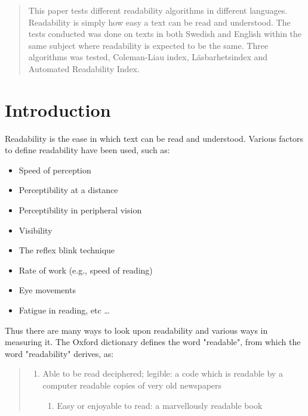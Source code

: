 \documentclass[a4paper]{article}
\begin{document}
\begin{abstract}
This paper tests different readability algorithms in different languages. Readability is simply how easy a text can be read and understood. The tests conducted was done on texts in both Swedish and English within the same subject where readability is expected to be the same. Three algorithms was tested, Coleman-Liau index, Läsbarhetsindex and Automated Readability Index. 
\end{abstract}
\newpage

\tableofcontents
\newpage


\section{Introduction}

Readability is the ease in which text can be read and understood. Various factors to define readability have been used, such as:

\begin{itemize}
  \item Speed of perception
  \item Perceptibility at a distance
  \item Perceptibility in peripheral vision
  \item Visibility
  \item The reflex blink technique
  \item Rate of work (e.g., speed of reading)
  \item Eye movements
  \item Fatigue in reading, etc \ldots
\end{itemize}

Thus there are many ways to look upon readability and various ways in measuring it. The Oxford dictionary defines the word "readable", from which the word "readability" derives, as:

\begin{quote}
    \begin{enumerate}
        \item Able to be read deciphered; legible: a code which is readable by a computer readable copies of very old newspapers
        \begin{enumerate}
            \item Easy or enjoyable to read: a marvellously readable book
        \end{enumerate}
    \end{enumerate}
\end{quote}
\end{document}
